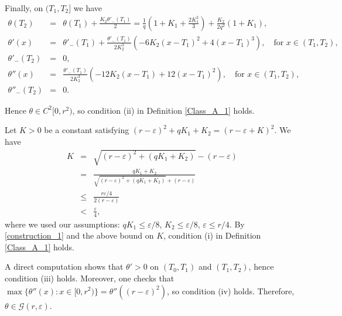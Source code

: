 \documentclass[a4paper,12pt,reqno]{amsart}
\theoremstyle{definition}
\theoremstyle{remark}
\newcommand{\eps}{\varepsilon}
\newcommand{\calG}{\mathcal{G}}
\begin{document}
Finally, on $(T_1,T_2]$ we have
\begin{eqnarray}
\label{theta_T2_T0}
\theta(T_2) &=& \theta(T_1) + \frac{K_2 \theta'_{-}(T_1)}{2} = \frac{1}{q} \left(1+K_1+\frac{2 K_1^2}{3}\right) + \frac{K_2}{2q^2} \left(1+K_1\right),\\
\nonumber
\theta'(x) &=& \theta'_{-}(T_1) + \frac{\theta'_{-}(T_1)}{2K_2^3}\left(-6K_2(x-T_1)^2+4(x-T_1)^3\right),\quad \text{for $x \in (T_1,T_2)$,}\\
\theta'_{-}(T_2) &=& 0,\\
\nonumber
\theta''(x) &=& \frac{\theta'_{-}(T_1)}{2K_2^3}\left(-12K_2(x-T_1)+12(x-T_1)^2\right),\quad \text{for $x \in (T_1,T_2)$,}\\
\nonumber
\theta''_{-}(T_2) &=& 0.
\end{eqnarray}

Hence $\theta \in C^2[0,r^2)$, so condition (ii) in Definition \ref{Class_A_1} holds.

Let $K>0$ be a constant satisfying $(r-\eps)^2 + qK_1 + K_2 = (r - \eps + K)^2$. We have
\begin{eqnarray*}
K &=& \sqrt{(r - \eps)^2 + (qK_1 + K_2)} - (r - \eps)\\
&=& \frac{qK_1 + K_2}{\sqrt{(r - \eps)^2 + (qK_1 + K_2)} + (r - \eps)}\\
&\le& \frac{r \eps/4}{2(r - \eps)}\\
&<& \frac{\eps}{4},
\end{eqnarray*}
where we used our assumptions: $q K_1 \le \eps/8$, $K_2 \le \eps/8$, $\eps \le r/4$. 
By \eqref{construction_1} and the above bound on $K$, condition (i) in Definition \ref{Class_A_1} holds.

A direct computation shows that $\theta'>0$ on $(T_0,T_1)$ and $(T_1,T_2)$, hence condition (iii) holds.
Moreover, one checks that $\max\{\theta''(x):x\in[0,r^2)\}=\theta''((r-\eps)^2)$, so condition (iv) holds. Therefore, $\theta \in  \calG(r,\eps)$.
\end{document}
